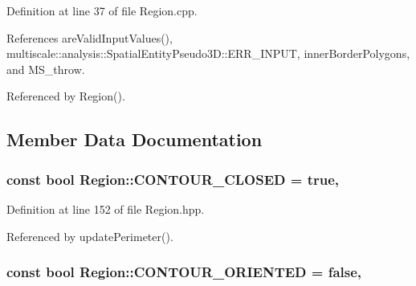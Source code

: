 Definition at line 37 of file Region.\-cpp.



References are\-Valid\-Input\-Values(), multiscale\-::analysis\-::\-Spatial\-Entity\-Pseudo3\-D\-::\-E\-R\-R\-\_\-\-I\-N\-P\-U\-T, inner\-Border\-Polygons, and M\-S\-\_\-throw.



Referenced by Region().



\subsection{Member Data Documentation}
\hypertarget{classmultiscale_1_1analysis_1_1Region_a52c0c66ccfe38dc19379abaeba529f19}{
\subsubsection[{C\-O\-N\-T\-O\-U\-R\-\_\-\-C\-L\-O\-S\-E\-D}]{\setlength{\rightskip}{0pt plus 5cm}const bool Region\-::\-C\-O\-N\-T\-O\-U\-R\-\_\-\-C\-L\-O\-S\-E\-D = true\hspace{0.3cm}{\ttfamily [static]}, {\ttfamily [private]}}}\label{classmultiscale_1_1analysis_1_1Region_a52c0c66ccfe38dc19379abaeba529f19}


Definition at line 152 of file Region.\-hpp.



Referenced by update\-Perimeter().

\hypertarget{classmultiscale_1_1analysis_1_1Region_a875a0f14dacf6904cabfa1f31020e6e2}{
\subsubsection[{C\-O\-N\-T\-O\-U\-R\-\_\-\-O\-R\-I\-E\-N\-T\-E\-D}]{\setlength{\rightskip}{0pt plus 5cm}const bool Region\-::\-C\-O\-N\-T\-O\-U\-R\-\_\-\-O\-R\-I\-E\-N\-T\-E\-D = false\hspace{0.3cm}{\ttfamily [static]}, {\ttfamily [private]}}}\label{classmultiscale_1_1analysis_1_1Region_a875a0f14dacf6904cabfa1f31020e6e2}


